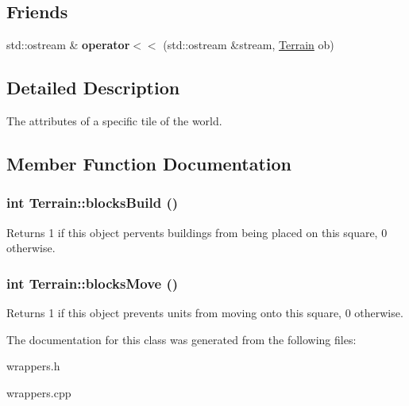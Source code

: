 \subsection*{Friends}
\begin{CompactItemize}
\item 
\hypertarget{classTerrain_276298433a740eda4ee02befa9155ff4}{
std::ostream \& \textbf{operator$<$$<$} (std::ostream \&stream, \hyperlink{classTerrain}{Terrain} ob)}
\label{classTerrain_276298433a740eda4ee02befa9155ff4}

\end{CompactItemize}


\subsection{Detailed Description}
The attributes of a specific tile of the world. 

\subsection{Member Function Documentation}
\hypertarget{classTerrain_f2ae042e3aecc89c7746c04e2498e45b}{
\subsubsection[{blocksBuild}]{\setlength{\rightskip}{0pt plus 5cm}int Terrain::blocksBuild ()}}
\label{classTerrain_f2ae042e3aecc89c7746c04e2498e45b}


Returns 1 if this object pervents buildings from being placed on this square, 0 otherwise. \hypertarget{classTerrain_80105933c1d08553db9d7c9abca47251}{
\subsubsection[{blocksMove}]{\setlength{\rightskip}{0pt plus 5cm}int Terrain::blocksMove ()}}
\label{classTerrain_80105933c1d08553db9d7c9abca47251}


Returns 1 if this object prevents units from moving onto this square, 0 otherwise. 

The documentation for this class was generated from the following files:\begin{CompactItemize}
\item 
wrappers.h\item 
wrappers.cpp\end{CompactItemize}
